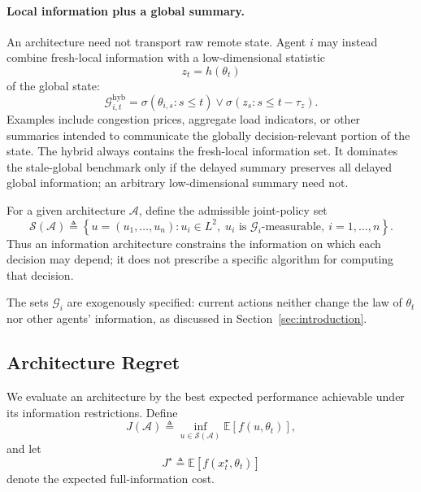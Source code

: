\documentclass[11pt]{article}
\begin{document}
\paragraph{Local information plus a global summary.}
An architecture need not transport raw remote state. Agent $i$ may instead
combine fresh-local information with a low-dimensional statistic
\[
    z_t=h(\theta_t)
\]
of the global state:
\begin{equation}
    \mathcal{G}_{i,t}^{\mathrm{hyb}}
    =
    \sigma\!\left(
        \theta_{i,s}:s\le t
    \right)
    \vee
    \sigma\!\left(
        z_s:s\le t-\tau_z
    \right).
    \label{eq:hybrid_arch}
\end{equation}
Examples include congestion prices, aggregate load indicators, or other
summaries intended to communicate the globally decision-relevant portion of
the state. The hybrid always contains the fresh-local information set. It
dominates the stale-global benchmark only if the delayed summary preserves all
delayed global information; an arbitrary low-dimensional summary need not.

For a given architecture $\mathcal{A}$, define the admissible joint-policy set
\begin{equation}
    \mathcal{S}(\mathcal{A})
    \triangleq
    \left\{
        u=(u_1,\ldots,u_n):
        u_i\in L^2,\;
        u_i \text{ is }\mathcal{G}_i\text{-measurable},
        \ i=1,\ldots,n
    \right\}.
    \label{eq:policy_subspace}
\end{equation}
Thus an information architecture constrains the information on which each
decision may depend; it does not prescribe a specific algorithm for computing
that decision.

The sets $\mathcal{G}_i$ are exogenously specified: current actions neither
change the law of $\theta_t$ nor other agents' information, as discussed in
Section~\ref{sec:introduction}.

\subsection{Architecture Regret}
\label{subsec:architecture_regret}

We evaluate an architecture by the best expected performance achievable under
its information restrictions. Define
\begin{equation}
    J(\mathcal{A})
    \triangleq
    \inf_{u\in\mathcal{S}(\mathcal{A})}
    \mathbb{E}
    \left[
        f(u,\theta_t)
    \right],
    \label{eq:architecture_cost}
\end{equation}
and let
\begin{equation}
    J^\star
    \triangleq
    \mathbb{E}
    \left[
        f(x_t^\star,\theta_t)
    \right]
    \label{eq:clairvoyant_cost}
\end{equation}
denote the expected full-information cost.
\end{document}
